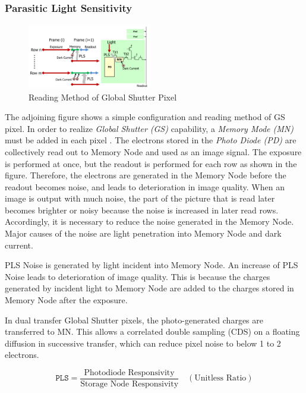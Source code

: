 \documentclass[../../main.tex]{subfiles}
\begin{document}
\subsubsection{Parasitic Light Sensitivity} %
\begin{figure}
  \begin{center}
    \includegraphics[width=0.48\textwidth]{Figures/Model/CMOS_PLS.jpeg}
  \end{center}
  \label{fig:PLS}
  \caption{Reading Method of Global Shutter Pixel \cite{PLS}}
\end{figure}

The adjoining figure shows a simple configuration and reading method of GS pixel. In order to realize \emph{Global Shutter (GS)} capability, a \emph{Memory Mode (MN)} must be added in each pixel . The electrons stored in the \emph{Photo Diode (PD)} are collectively read out to Memory Node and used as an image signal. The exposure is performed at once, but the readout is performed for each row as shown in the figure. Therefore, the electrons are generated in the Memory Node before the readout becomes noise, and leads to deterioration in image quality. When an image is output with much noise, the part of the picture that is read later becomes brighter or noisy because the noise is increased in later read rows. Accordingly, it is necessary to reduce the noise generated in the Memory Node. Major causes of the noise are light penetration into Memory Node and dark current. \cite{PLS}

PLS Noise is generated by light incident into Memory Node. An increase of PLS Noise leads to deterioration of image quality. This is because the charges generated by incident light to Memory Node are added to the charges stored in Memory Node after the exposure.

In dual transfer Global Shutter pixels, the photo-generated charges are transferred to MN. This allows a correlated double sampling (CDS) on a floating diffusion in successive transfer, which can reduce pixel noise to below 1 to 2 electrons.

\begin{equation*}
    \texttt{PLS} = \frac{\text{Photodiode Responsivity}}{\text{Storage Node Responsivity}} \quad (\text{Unitless Ratio})
\end{equation*}
\end{document}
